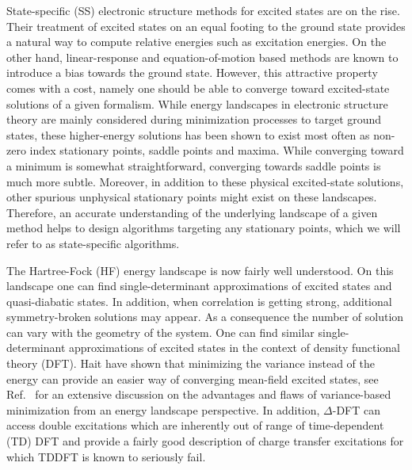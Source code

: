 \documentclass[aip,jcp,reprint,noshowkeys,superscriptaddress]{revtex4-1}
\begin{document}
State-specific (SS) electronic structure methods for excited states are on the rise. \cite{Gilbert_2008,Barca_2014,Thom_2008,Ye_2017,Barca_2018a,Thompson_2018,Hait_2020,Carter-Fenk_2020,Hait_2021,Mayhall_2010,Lee_2019,Kossoski_2021}
Their treatment of excited states on an equal footing to the ground state provides a natural way to compute relative energies such as excitation energies.
On the other hand, linear-response and equation-of-motion based methods are known to introduce a bias towards the ground state. \cite{McLachlan_1964,Runge_1984,Dreuw_2005,Burke_2005,Bartlett_2012,Helmich-Paris_2019}
However, this attractive property comes with a cost, namely one should be able to converge toward excited-state solutions of a given formalism.
While energy landscapes in electronic structure theory are mainly considered during minimization processes to target ground states, these higher-energy solutions has been shown to exist most often as non-zero index stationary points, \ie saddle points and maxima. \cite{Burton_2021}
While converging toward a minimum is somewhat straightforward, converging towards saddle points is much more subtle.
Moreover, in addition to these physical excited-state solutions, other spurious unphysical stationary points might exist on these landscapes.
Therefore, an accurate understanding of the underlying landscape of a given method helps to design algorithms targeting any stationary points, which we will refer to as state-specific algorithms. \cite{Burton_2022}

The Hartree-Fock (HF) \cite{Szabo_1996} energy landscape is now fairly well understood.\cite{Thompson_2018,Dong_2020,Burton_2021}
On this landscape one can find single-determinant approximations of excited states \cite{Gilbert_2008,Barca_2014} and quasi-diabatic states. \cite{Thom_2009}
In addition, when correlation is getting strong, additional symmetry-broken solutions may appear.\cite{Coulson_1949}
As a consequence the number of solution can vary with the geometry of the system.
One can find similar single-determinant approximations of excited states in the context of density functional theory (DFT). \cite{Hait_2020,Hait_2021}
Hait \etal have shown that minimizing the variance instead of the energy can provide an easier way of converging mean-field excited states, \cite{Hait_2020} see Ref.~ for an extensive discussion on the advantages and flaws of variance-based minimization from an energy landscape perspective.
In addition, $\Delta$-DFT can access double excitations which are inherently out of range of time-dependent (TD) DFT \cite{Hait_2021} and provide a fairly good description of charge transfer excitations for which TDDFT is known to seriously fail. \cite{Tozer_2003,Dreuw_2004,Hait_2021} 
\end{document}
